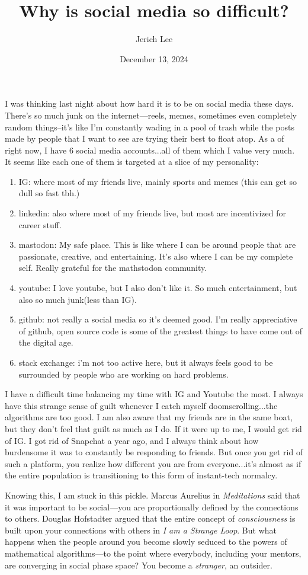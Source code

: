 \documentclass[12pt]{article}
\title{Why is social media so difficult?}
\author{Jerich Lee}
\date{December 13, 2024}
\theoremstyle{definition} %
\theoremstyle{plain} %
\begin{document}
\maketitle
I was thinking last night about how hard it is to be on social media these days. There's so much junk on the internet—reels, memes, sometimes even completely random things–it's like I'm constantly wading in a pool of trash while the posts made by people that I want to see are trying their best
to float atop. As a of right now, I have 6 social media accounts...all of them which I value very much. It seems like each one of them is targeted at a slice of my personality:
\begin{enumerate}
    \item IG: where most of my friends live, mainly sports and memes (this can get so dull so fast tbh.)
    \item linkedin: also where most of my friends live, but most are incentivized for career stuff.
    \item mastodon: My safe place. This is like where I can be around people that are passionate, creative, and entertaining. It's also where I can be my complete self. Really grateful for the mathstodon community.
    \item youtube: I love youtube, but I also don't like it. So much entertainment, but also so much junk(less than IG). 
    \item github: not really a social media so it's deemed good. I'm really appreciative of github, open source code is some of the greatest things to have come out of the digital age.
    \item stack exchange: i'm not too active here, but it always feels good to be surrounded by people who are working on hard problems.
\end{enumerate}
I have a difficult time balancing my time with IG and Youtube the most. I always have this strange sense of guilt whenever I catch myself doomscrolling...the algorithms are too good. I am also aware that my friends are in the same boat, but they don't feel that guilt as much as I do.
If it were up to me, I would get rid of IG. I got rid of Snapchat a year ago, and I always think about how burdensome it was to constantly be responding to friends. But once you get rid of such a platform, you realize how different you are from everyone...it's almost as if the entire population is transitioning to this form of instant-tech normalcy. 
\vspace{.5cm} 

Knowing this, I am stuck in this pickle. Marcus Aurelius in \emph{Meditations} said that it was important to be social—you are proportionally defined by the connections to others. Douglas Hofstadter argued that the entire concept of \emph{consciousness} is built upon your connections with others in \emph{I am a Strange Loop}. But what happens when the people around you become slowly seduced to the powers of mathematical algorithms—to the point where everybody, including your mentors, are converging in social phase space? You become a \emph{stranger}, an outsider. 
\vspace{.5cm} 
\end{document}
